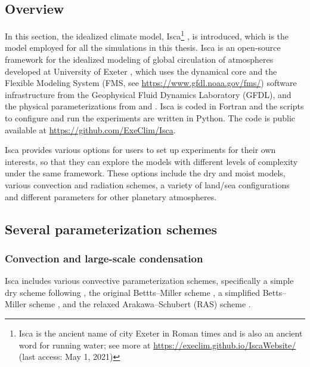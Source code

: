 \subsection{Overview}

In this section, the idealized climate model, Isca\footnote{Isca is the ancient name of city Exeter in Roman times and is also an ancient word for running water; see more at \url{https://execlim.github.io/IscaWebsite/} (last access: May 1, 2021)} \citep{Vallis2018}, is introduced, which is the model employed for all the simulations in this thesis. Isca is an open-source framework for the idealized modeling of global circulation of atmospheres developed at University of Exeter \citep{Vallis2018}, which uses the dynamical core and the Flexible Modeling System (FMS, see \url{https://www.gfdl.noaa.gov/fms/}) software infrastructure from the Geophysical Fluid Dynamics Laboratory (GFDL), and the physical parameterizations from \citet{Frierson2006} and \citet{Frierson2007}. Isca is coded in Fortran and the scripts to configure and run the experiments are written in Python. The code is public available at \url{https://github.com/ExeClim/Isca}.

Isca provides various options for users to set up experiments for their own interests, so that they can explore the models with different levels of complexity under the same framework. These options include the dry and moist models, various convection and radiation schemes, a variety of land/sea configurations and different parameters for other planetary atmospheres.

\subsection{Several parameterization schemes}

\subsubsection{Convection and large-scale condensation}

Isca includes various convective parameterization schemes, specifically a simple dry scheme following \cite{Walker2006eddy}, the original Bettts--Miller scheme \citep[a covective relaxation scheme;][]{Betts1986,BettsMiller1986}, a simplified Betts--Miller scheme \citep[SBM;][]{Frierson2007}, and the relaxed Arakawa--Schubert (RAS) scheme \citep[a mass-flux based scheme;][]{Moorthi1992relaxed}.

